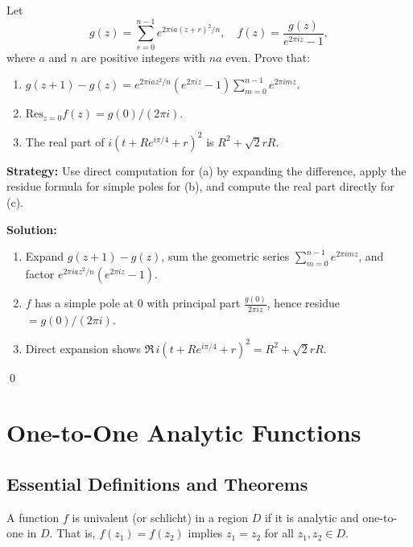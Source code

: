 \begin{problembox}
\begin{problemstatement}
Let
\[ g(z) = \sum_{r=0}^{n-1} e^{2\pi i a (z + r)^2 / n}, \quad f(z) = \frac{g(z)}{e^{2\pi i z} - 1}, \]
where \( a \) and \( n \) are positive integers with \( na \) even. Prove that:
\begin{enumerate}[label=(\alph*)]
\item \( g(z + 1) - g(z) = e^{2\pi i a z^2 / n} (e^{2\pi i z} - 1) \sum_{m=0}^{n-1} e^{2\pi i m z}. \)
\item \( \text{Res}_{z=0} f(z) = g(0) / (2\pi i). \)
\item The real part of \( i (t + R e^{i\pi / 4} + r)^2 \) is \( R^2 + \sqrt{2} r R \).
\end{enumerate}
\end{problemstatement}
\end{problembox}

\noindent\textbf{Strategy:} Use direct computation for (a) by expanding the difference, apply the residue formula for simple poles for (b), and compute the real part directly for (c).

\bigskip\noindent\textbf{Solution:}
\begin{enumerate}[label=(\alph*)]
\item Expand $g(z+1)-g(z)$, sum the geometric series $\sum_{m=0}^{n-1}e^{2\pi i m z}$, and factor $e^{2\pi i a z^2/n}(e^{2\pi i z}-1)$.
\item $f$ has a simple pole at $0$ with principal part $\frac{g(0)}{2\pi i z}$, hence residue $=g(0)/(2\pi i)$.
\item Direct expansion shows $\Re\,i(t+Re^{i\pi/4}+r)^2=R^2+\sqrt2 rR$.
\end{enumerate}\qed
\section{One-to-One Analytic Functions}

\subsection*{Essential Definitions and Theorems}

\begin{definition}
A function $f$ is univalent (or schlicht) in a region $D$ if it is analytic and one-to-one in $D$. That is, $f(z_1) = f(z_2)$ implies $z_1 = z_2$ for all $z_1, z_2 \in D$.
\end{definition}

